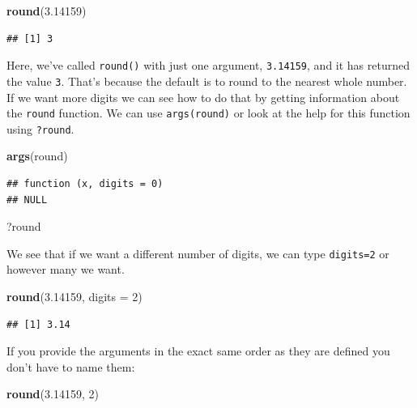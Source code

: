 \documentclass[]{book}
\newenvironment{Shaded}{\begin{snugshade}}{\end{snugshade}}
\newcommand{\KeywordTok}[1]{\textcolor[rgb]{0.13,0.29,0.53}{\textbf{#1}}}
\newcommand{\DataTypeTok}[1]{\textcolor[rgb]{0.13,0.29,0.53}{#1}}
\newcommand{\DecValTok}[1]{\textcolor[rgb]{0.00,0.00,0.81}{#1}}
\newcommand{\FloatTok}[1]{\textcolor[rgb]{0.00,0.00,0.81}{#1}}
\newcommand{\NormalTok}[1]{#1}
\begin{document}
\begin{Shaded}
\begin{Highlighting}[]
\KeywordTok{round}\NormalTok{(}\FloatTok{3.14159}\NormalTok{)}
\end{Highlighting}
\end{Shaded}

\begin{verbatim}
## [1] 3
\end{verbatim}

Here, we've called \texttt{round()} with just one argument,
\texttt{3.14159}, and it has returned the value \texttt{3}. That's
because the default is to round to the nearest whole number. If we want
more digits we can see how to do that by getting information about the
\texttt{round} function. We can use \texttt{args(round)} or look at the
help for this function using \texttt{?round}.

\begin{Shaded}
\begin{Highlighting}[]
\KeywordTok{args}\NormalTok{(round)}
\end{Highlighting}
\end{Shaded}

\begin{verbatim}
## function (x, digits = 0) 
## NULL
\end{verbatim}

\begin{Shaded}
\begin{Highlighting}[]
\NormalTok{?round}
\end{Highlighting}
\end{Shaded}

We see that if we want a different number of digits, we can type
\texttt{digits=2} or however many we want.

\begin{Shaded}
\begin{Highlighting}[]
\KeywordTok{round}\NormalTok{(}\FloatTok{3.14159}\NormalTok{, }\DataTypeTok{digits =} \DecValTok{2}\NormalTok{)}
\end{Highlighting}
\end{Shaded}

\begin{verbatim}
## [1] 3.14
\end{verbatim}

If you provide the arguments in the exact same order as they are defined
you don't have to name them:

\begin{Shaded}
\begin{Highlighting}[]
\KeywordTok{round}\NormalTok{(}\FloatTok{3.14159}\NormalTok{, }\DecValTok{2}\NormalTok{)}
\end{Highlighting}
\end{Shaded}
\end{document}
